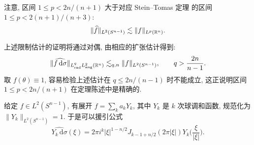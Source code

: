 注意, 区间 $1 \leq p < 2n/(n+1)$ 大于对应 Stein--Tomas 定理 \cite{b1,b13,b128} 的区间 $1 \leq p < 2(n+1)/(n+3)$:
\begin{align*}
  \|\widehat{f}\|_{L^{2}(S^{n-1})}\lesssim\|f\|_{L^{p}(\mathbb{R}^{n})}.
\end{align*}

上述限制估计的证明将通过对偶, 由相应的扩张估计得到:
\begin{align*}
  \|\widehat{f\,\mathrm{d}\sigma}\|_{L_{\mathrm{rad}}^{q}L_{\mathrm{ang}}^{2}(\mathbb{R}^{n})}
  \lesssim_{q,n}\|f\|_{L^{2}(S^{n-1})},\qquad q>\frac{2n}{n-1}.
\end{align*}
取 $f(\theta) \equiv 1$, 容易检验上述估计在 $q \leq 2n/(n-1)$ 时不能成立, 这正说明区间 $1 \leq p < 2n/(n+1)$ 在定理陈述中是精确的.

给定 $f \in L^2(S^{n-1})$, 有展开 $f = \sum_k a_k Y_k$, 其中 $Y_k$ 是 $k$ 次球调和函数, 规范化为 $\|Y_k\|_{L^2(S^{n-1})} = 1$. 于是可以援引公式
\begin{equation}\label{eq:6.5}
  \widehat{Y_{k}\,\mathrm{d}\sigma}(\xi)
  =2\pi i^{k}\left|\xi\right|^{1-n/2}J_{k-1+n/2}(2\pi|\xi|)Y_{k}\Big(\frac{\xi}{\left|\xi\right|}\Big).
\end{equation}

